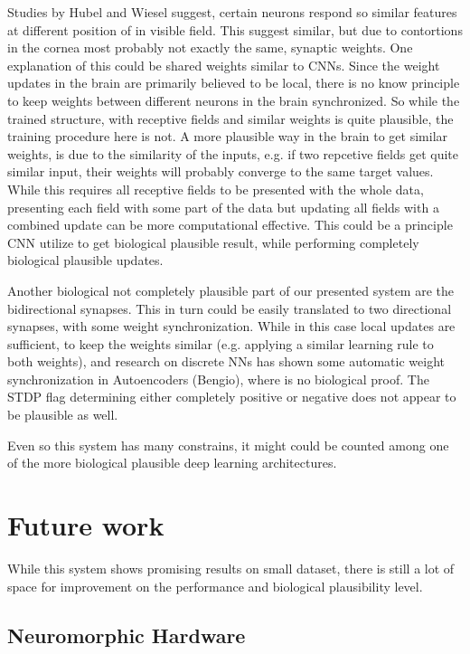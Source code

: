 Studies by Hubel and Wiesel suggest, certain neurons respond so similar features at different position of in visible field.
This suggest similar, but due to contortions in the cornea most probably not exactly the same, synaptic weights. 
One explanation of this could be shared weights similar to CNNs. 
Since the weight updates in the brain are primarily believed to be local, there is no know principle to keep weights between different neurons in the brain synchronized.
So while the trained structure, with receptive fields and similar weights is quite plausible, the training procedure here is not.
A more plausible way in the brain to get similar weights, is due to the similarity of the inputs, e.g. if two repcetive fields get quite similar input, their weights will probably converge to the same target values.  
While this requires all receptive fields to be presented with the whole data, presenting each field with some part of the data but updating all fields with a combined update can be more computational effective. 
This could be a principle CNN utilize to get biological plausible result, while performing completely biological plausible updates.

Another biological not completely plausible part of our presented system are the bidirectional synapses.
This in turn could be easily translated to two directional synapses, with some weight synchronization. 
While in this case local updates are sufficient, to keep the weights similar (e.g. applying a similar learning rule to both weights), and research on discrete NNs has shown some automatic weight synchronization in Autoencoders (Bengio), where is no biological proof.
The STDP flag determining either completely positive or negative does not appear to be plausible as well.

Even so this system has many constrains, it might could be counted among one of the more biological plausible deep learning architectures.     

\section{Future work}

While this system shows promising results on small dataset, there is still a lot of space for improvement on the performance and biological plausibility level.

\subsection{Neuromorphic Hardware}

